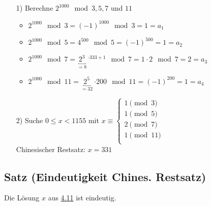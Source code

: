 \documentclass[12pt,titlepage, pdf]{article}
\renewcommand{\>}{\rightarrow}
\renewcommand{\*}{\cdot}
\begin{document}
\begin{itemize}
		      	\begin{itemize}
		      		\item[1)] Berechne $2^{1000} \mod 3,5,7$ und $11$
		      		      \begin{itemize}
		      		      	\item $2^{1000} \mod 3 = (-1)^{1000} \mod 3 = 1=a_1$
		      		      	\item $2^{1000} \mod 5 = 4^{500} \mod 5 = (-1)^{500} = 1=a_2$
		      		      	\item $2^{1000} \mod 7 = \underbracket{2^3}_{=8}~^{\*333+1} \mod 7 = 1 \cdot 2\mod 7 = 2=a_3$
		      		      	\item $2^{1000} \mod 11 = \underbracket{2^5}_{=32}~{\*200} \mod 11 = (-1)^{200} = 1=a_4$
		      		      \end{itemize}
		      		\item[2)] Suche $0 \leq x < 1155$ mit $x \equiv \begin{cases*}
		      		      1 \pmod{3}\\
		      		      1 \pmod {5}\\
		      		      2 \pmod {7}\\
		      		      1 \pmod{ 11}\\
		      		\end{cases*}$\\
		      		Chinesischer Restsatz: $x = 331$
		      	\end{itemize}
		      	\end{itemize}
		      	\subsection{Satz (Eindeutigkeit Chines. Restsatz)}
		      	\label{4.13}
		      	Die Lösung $x$ aus \hyperref[4.11]{4.11} ist eindeutig.
\end{document}
